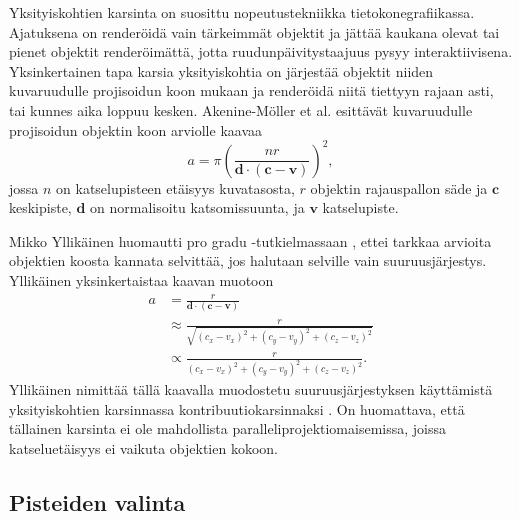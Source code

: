Yksityiskohtien karsinta  on suosittu nopeutustekniikka tietokonegrafiikassa. Ajatuksena on renderöidä vain tärkeimmät objektit ja jättää kaukana olevat tai pienet objektit renderöimättä, jotta ruudunpäivitystaajuus pysyy interaktiivisena. Yksinkertainen tapa karsia yksityiskohtia on järjestää objektit niiden kuvaruudulle projisoidun koon mukaan ja renderöidä niitä tiettyyn rajaan asti, tai kunnes aika loppuu kesken. Akenine-Möller et al. \cite{rrr} esittävät kuvaruudulle projisoidun objektin koon arviolle kaavaa 
\begin{equation}
    a = \pi (\frac{nr}{\mathbf{d} \cdot (\mathbf{c}-\mathbf{v})})^2,
\end{equation} jossa $n$ on katselupisteen etäisyys kuvatasosta, $r$ objektin rajauspallon säde ja $\mathbf{c}$ keskipiste, $\mathbf{d}$ on normalisoitu katsomissuunta, ja $\mathbf{v}$ katselupiste. \cite{mikko}

Mikko Yllikäinen huomautti pro gradu -tutkielmassaan \cite{mikko}, ettei tarkkaa arvioita objektien koosta kannata selvittää, jos halutaan selville vain suuruusjärjestys. Yllikäinen yksinkertaistaa kaavan muotoon 
\begin{equation}
    \begin{split}
    a & = \frac{r}{\mathbf{d} \cdot ( \mathbf{c} - \mathbf{v} )}\\
    & \approx \frac{r}{\sqrt{(c_x-v_x)^2 + (c_y-v_y)^2 + (c_z - v_z)^2}}\\
    & \propto \frac{r}{(c_x-v_x)^2 + (c_y-v_y)^2 + (c_z - v_z)^2}.    
    \end{split}
\end{equation}
 Yllikäinen nimittää tällä kaavalla muodostetu suuruusjärjestyksen käyttämistä yksityiskohtien karsinnassa kontribuutiokarsinnaksi . On huomattava, että tällainen karsinta ei ole mahdollista paralleliprojektiomaisemissa, joissa katseluetäisyys ei vaikuta objektien kokoon. \cite{mikko}


\subsection{Pisteiden valinta}

